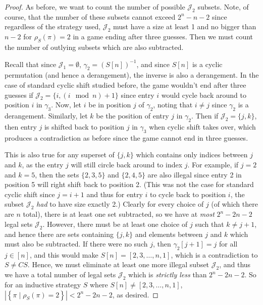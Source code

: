 \documentclass[article]{amsart}
\theoremstyle{definition}
\theoremstyle{definition}
\theoremstyle{remark}
\begin{document}
\begin{proof}
As before, we want to count the number of possible $\mathcal{J}_2$ subsets. Note, of course, that the number of these subsets cannot exceed $2^n - n - 2$ since regardless of the strategy used, $\mathcal{J}_2$ must have a size at least 1 and no bigger than $n-2$ for $\rho_S(\pi) = 2$ in a game ending after three guesses. Then we must count the number of outlying subsets which are also subtracted. 

Recall that since $\mathcal{J}_1 = \emptyset$, $\gamma_2 = (S[n])^{-1}$, and since $S[n]$ is a cyclic permutation (and hence a derangement), the inverse is also a derangement. In the case of standard cyclic shift studied before, the game wouldn't end after three guesses if $\mathcal{J}_2 = \{i, (i \mod n)+1 \}$ since entry $i$ would cycle back around to position $i$ in $\gamma_3$. Now, let $i$ be in position $j$ of $\gamma_2$, noting that $i \neq j$ since $\gamma_2$ is a derangement. Similarly, let $k$ be the position of entry $j$ in $\gamma_2$. Then if $\mathcal{J}_2 = \{ j,k \}$, then entry $j$ is shifted back to position $j$ in $\gamma_3$ when cyclic shift takes over, which produces a contradiction as before since the game cannot end in three guesses. 

This is also true for any superset of $\{j,k\}$ which contains only indices between $j$ and $k$, as the entry $j$ will still circle back around to index $j$. For example, if $j = 2$ and $k=5$, then the sets $\{2,3,5\}$ and $\{2,4,5\}$ are also illegal since entry 2 in position 5 will right shift back to position 2. (This was not the case for standard cyclic shift since $j = i+1$ and thus for entry $i$ to cycle back to position $i$, the subset $\mathcal{J}_2$ \textit{had} to have size exactly 2.) Clearly for every choice of $j$ (of which there are $n$ total), there is at least one set subtracted, so we have at \textit{most} $2^n - 2n - 2$ legal sets $\mathcal{J}_2$. However, there must be at least one choice of $j$ such that $k \neq j+1$, and hence there are sets containing $\{j,k\}$ and elements between $j$ and $k$ which must also be subtracted. If there were no such $j$, then $\gamma_2[j+1] = j$ for all $j \in [n]$, and this would make $S[n] = [2,3,\dots, n,1]$, which is a contradiction to $S \neq CS$. Hence, we must eliminate at least one more illegal subset $\mathcal{J}_2$, and thus we have a total number of legal sets $\mathcal{J}_2$ which is \textit{strictly less} than $2^n - 2n - 2$. So for an inductive strategy $S$ where $S[n] \neq [2,3,\dots,n,1]$, $\left| \left\{ \pi \mid \rho_{S}(\pi) = 2 \right\} \right| < 2^n - 2n - 2$, as desired.

    
\end{proof}
\end{document}
